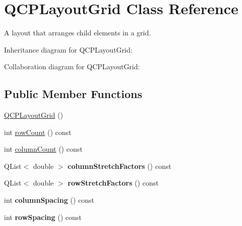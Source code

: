 \hypertarget{classQCPLayoutGrid}{}\section{Q\+C\+P\+Layout\+Grid Class Reference}
\label{classQCPLayoutGrid}


A layout that arranges child elements in a grid.  




Inheritance diagram for Q\+C\+P\+Layout\+Grid\+:


Collaboration diagram for Q\+C\+P\+Layout\+Grid\+:
\subsection*{Public Member Functions}
\begin{DoxyCompactItemize}
\item 
\hyperlink{classQCPLayoutGrid_ab2a4c1587dc8aed4c41c509c8d8d2a64}{Q\+C\+P\+Layout\+Grid} ()
\item 
int \hyperlink{classQCPLayoutGrid_af8e6c7a05864ebe610c87756c7b9079c}{row\+Count} () const 
\item 
int \hyperlink{classQCPLayoutGrid_ac39074eafd148b82d0762090f258189e}{column\+Count} () const 
\item 
Q\+List$<$ double $>$ {\bfseries column\+Stretch\+Factors} () const \hypertarget{classQCPLayoutGrid_a39bd7994d00687d1b9defef6f1bda835}{}\label{classQCPLayoutGrid_a39bd7994d00687d1b9defef6f1bda835}

\item 
Q\+List$<$ double $>$ {\bfseries row\+Stretch\+Factors} () const \hypertarget{classQCPLayoutGrid_a3744496abf73c8e3b464181d63bb20a7}{}\label{classQCPLayoutGrid_a3744496abf73c8e3b464181d63bb20a7}

\item 
int {\bfseries column\+Spacing} () const \hypertarget{classQCPLayoutGrid_a3de19753fdca81194458cb15156f7315}{}\label{classQCPLayoutGrid_a3de19753fdca81194458cb15156f7315}

\item 
int {\bfseries row\+Spacing} () const \hypertarget{classQCPLayoutGrid_abccdd33c1b284feb6df90fa02f23d9a3}{}\label{classQCPLayoutGrid_abccdd33c1b284feb6df90fa02f23d9a3}


\end{DoxyCompactItemize}
